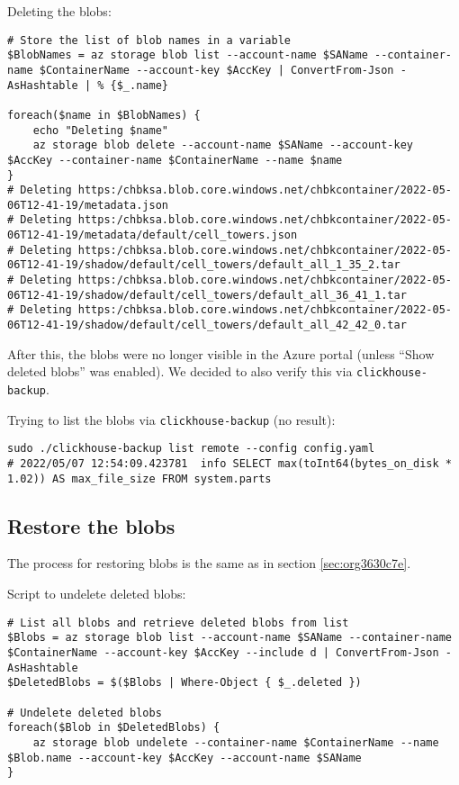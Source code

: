 Deleting the blobs:
\begin{verbatim}
# Store the list of blob names in a variable
$BlobNames = az storage blob list --account-name $SAName --container-name $ContainerName --account-key $AccKey | ConvertFrom-Json -AsHashtable | % {$_.name}

foreach($name in $BlobNames) {
    echo "Deleting $name"
    az storage blob delete --account-name $SAName --account-key $AccKey --container-name $ContainerName --name $name
}
# Deleting https:/chbksa.blob.core.windows.net/chbkcontainer/2022-05-06T12-41-19/metadata.json
# Deleting https:/chbksa.blob.core.windows.net/chbkcontainer/2022-05-06T12-41-19/metadata/default/cell_towers.json
# Deleting https:/chbksa.blob.core.windows.net/chbkcontainer/2022-05-06T12-41-19/shadow/default/cell_towers/default_all_1_35_2.tar
# Deleting https:/chbksa.blob.core.windows.net/chbkcontainer/2022-05-06T12-41-19/shadow/default/cell_towers/default_all_36_41_1.tar
# Deleting https:/chbksa.blob.core.windows.net/chbkcontainer/2022-05-06T12-41-19/shadow/default/cell_towers/default_all_42_42_0.tar
\end{verbatim}

After this, the blobs were no longer visible in the Azure portal (unless ``Show deleted blobs'' was enabled).
We decided to also verify this via \texttt{clickhouse-backup}.

Trying to list the blobs via \texttt{clickhouse-backup} (no result):
\begin{verbatim}
sudo ./clickhouse-backup list remote --config config.yaml
# 2022/05/07 12:54:09.423781  info SELECT max(toInt64(bytes_on_disk * 1.02)) AS max_file_size FROM system.parts
\end{verbatim}

\subsection{Restore the blobs}
\label{sec:org9a5b383}
The process for restoring blobs is the same as in section \ref{sec:org3630c7e}.

Script to undelete deleted blobs:
\begin{verbatim}
# List all blobs and retrieve deleted blobs from list
$Blobs = az storage blob list --account-name $SAName --container-name $ContainerName --account-key $AccKey --include d | ConvertFrom-Json -AsHashtable
$DeletedBlobs = $($Blobs | Where-Object { $_.deleted })

# Undelete deleted blobs
foreach($Blob in $DeletedBlobs) {
    az storage blob undelete --container-name $ContainerName --name $Blob.name --account-key $AccKey --account-name $SAName
}
\end{verbatim}

